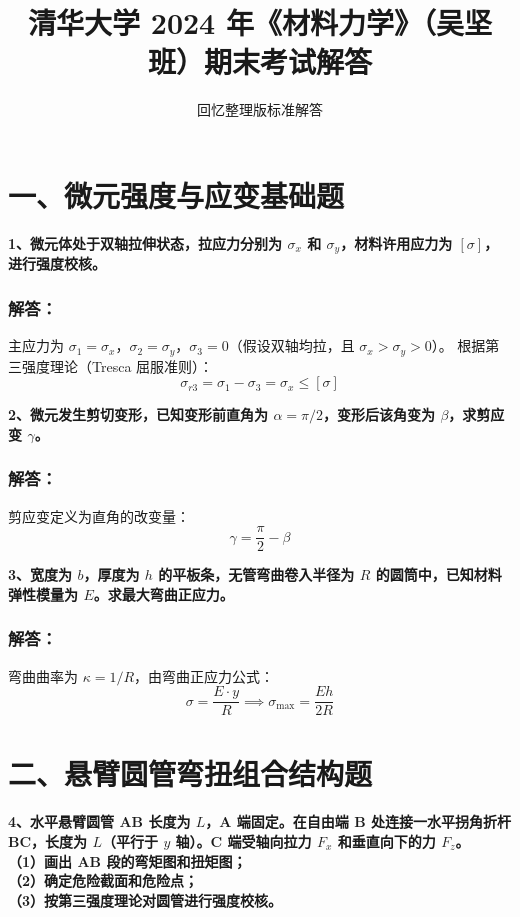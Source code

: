 \documentclass[UTF8,fontset=windows]{ctexart}
\title{\vspace{-1.5cm}\textbf{清华大学 2024 年《材料力学》（吴坚班）期末考试解答}}
\author{回忆整理版标准解答}
\date{}
\begin{document}
\maketitle
\vspace{-1.0cm}

\section*{一、微元强度与应变基础题}

\textbf{1、微元体处于双轴拉伸状态，拉应力分别为 $\sigma_x$ 和 $\sigma_y$，材料许用应力为 $[\sigma]$，进行强度校核。}

\subsubsection*{解答：}
主应力为 $\sigma_1 = \sigma_x$，$\sigma_2 = \sigma_y$，$\sigma_3 = 0$（假设双轴均拉，且 $\sigma_x > \sigma_y > 0$）。
根据第三强度理论（Tresca 屈服准则）：
\[
    \sigma_{r3} = \sigma_1 - \sigma_3 = \sigma_x \le [\sigma]
\]

\textbf{2、微元发生剪切变形，已知变形前直角为 $\alpha = \pi/2$，变形后该角变为 $\beta$，求剪应变 $\gamma$。}

\subsubsection*{解答：}
剪应变定义为直角的改变量：
\[
    \gamma = \frac{\pi}{2} - \beta
\]

\textbf{3、宽度为 $b$，厚度为 $h$ 的平板条，无管弯曲卷入半径为 $R$ 的圆筒中，已知材料弹性模量为 $E$。求最大弯曲正应力。}

\subsubsection*{解答：}
弯曲曲率为 $\kappa = 1/R$，由弯曲正应力公式：
\[
    \sigma = \frac{E \cdot y}{R} \implies \sigma_{\max} = \frac{E h}{2R}
\]

\newpage

\section*{二、悬臂圆管弯扭组合结构题}

\textbf{4、水平悬臂圆管 AB 长度为 $L$，A 端固定。在自由端 B 处连接一水平拐角折杆 BC，长度为 $L$（平行于 $y$ 轴）。C 端受轴向拉力 $F_x$ 和垂直向下的力 $F_z$。\\
（1）画出 AB 段的弯矩图和扭矩图；\\
（2）确定危险截面和危险点；\\
（3）按第三强度理论对圆管进行强度校核。}
\end{document}
